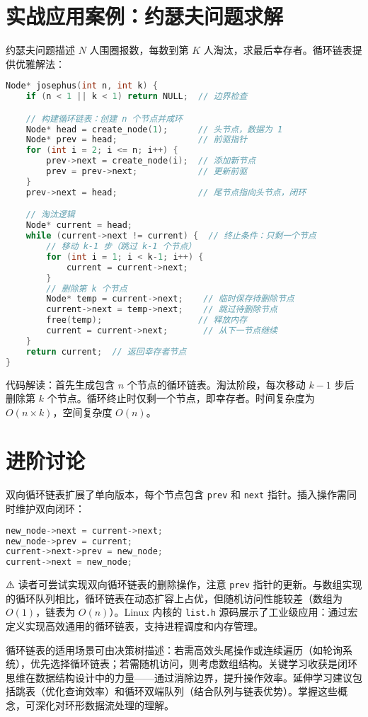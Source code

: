 \chapter{实战应用案例：约瑟夫问题求解}
约瑟夫问题描述 $N$ 人围圈报数，每数到第 $K$ 人淘汰，求最后幸存者。循环链表提供优雅解法：\par
\begin{lstlisting}[language=c]
Node* josephus(int n, int k) {
    if (n < 1 || k < 1) return NULL;  // 边界检查

    // 构建循环链表：创建 n 个节点并成环
    Node* head = create_node(1);      // 头节点，数据为 1
    Node* prev = head;                // 前驱指针
    for (int i = 2; i <= n; i++) {
        prev->next = create_node(i);  // 添加新节点
        prev = prev->next;            // 更新前驱
    }
    prev->next = head;                // 尾节点指向头节点，闭环

    // 淘汰逻辑
    Node* current = head;
    while (current->next != current) {  // 终止条件：只剩一个节点
        // 移动 k-1 步（跳过 k-1 个节点）
        for (int i = 1; i < k-1; i++) {
            current = current->next;
        }
        // 删除第 k 个节点
        Node* temp = current->next;    // 临时保存待删除节点
        current->next = temp->next;    // 跳过待删除节点
        free(temp);                   // 释放内存
        current = current->next;       // 从下一节点继续
    }
    return current;  // 返回幸存者节点
}
\end{lstlisting}
代码解读：首先生成包含 $n$ 个节点的循环链表。淘汰阶段，每次移动 $k-1$ 步后删除第 $k$ 个节点。循环终止时仅剩一个节点，即幸存者。时间复杂度为 $O(n \times k)$，空间复杂度 $O(n)$。\par
\chapter{进阶讨论}
双向循环链表扩展了单向版本，每个节点包含 \texttt{prev} 和 \texttt{next} 指针。插入操作需同时维护双向闭环：\par
\begin{lstlisting}[language=c]
new_node->next = current->next;
new_node->prev = current;
current->next->prev = new_node;
current->next = new_node;
\end{lstlisting}
⚠️ 读者可尝试实现双向循环链表的删除操作，注意 \texttt{prev} 指针的更新。与数组实现的循环队列相比，循环链表在动态扩容上占优，但随机访问性能较差（数组为 $O(1)$，链表为 $O(n)$）。Linux 内核的 \texttt{list.h} 源码展示了工业级应用：通过宏定义实现高效通用的循环链表，支持进程调度和内存管理。\par
循环链表的适用场景可由决策树描述：若需高效头尾操作或连续遍历（如轮询系统），优先选择循环链表；若需随机访问，则考虑数组结构。关键学习收获是闭环思维在数据结构设计中的力量——通过消除边界，提升操作效率。延伸学习建议包括跳表（优化查询效率）和循环双端队列（结合队列与链表优势）。掌握这些概念，可深化对环形数据流处理的理解。\par
